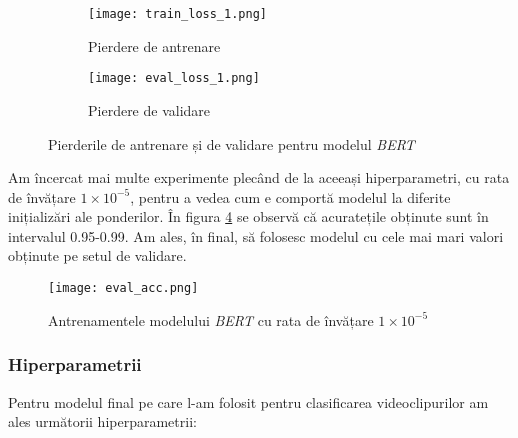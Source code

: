 \begin{figure}[ht]
    \centering
    \begin{subfigure}[b]{0.49\textwidth}
        \texttt{[image: train\_loss\_1.png]}
        \caption{Pierdere de antrenare}
        \label{fig:train_loss}
    \end{subfigure}
    \hfill %
    \begin{subfigure}[b]{0.49\textwidth}
        \texttt{[image: eval\_loss\_1.png]}
        \caption{Pierdere de validare}
        \label{fig:eval_loss}
    \end{subfigure}
    \caption{Pierderile de antrenare și de validare pentru modelul \textit{BERT}}
    \label{fig:loss_graphs}
\end{figure}
\vspace{-1em}

\par
Am încercat mai multe experimente plecând de la aceeași hiperparametri, cu rata de învățare $1 \times 10^{-5}$,
pentru a vedea cum e comportă modelul la diferite inițializări ale ponderilor. În figura \ref{fig:eval_acc}
se observă că acuratețile obținute sunt în intervalul 0.95-0.99. Am ales, în final, să folosesc modelul
cu cele mai mari valori obținute pe setul de validare.

\begin{figure}[h]
    \centering
    \texttt{[image: eval\_acc.png]}
    \caption{Antrenamentele modelului \textit{BERT} cu rata de învățare $1 \times 10^{-5}$}
    \label{fig:eval_acc}
\end{figure}

\vspace{-1.5em}
\subsubsection{Hiperparametrii}
Pentru modelul final pe care l-am folosit pentru clasificarea videoclipurilor am ales următorii hiperparametrii:


